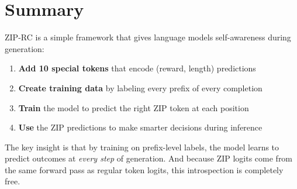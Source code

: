 \documentclass[11pt,a4paper]{article}
\begin{document}
\section{Summary}

ZIP-RC is a simple framework that gives language models self-awareness during generation:

\begin{enumerate}
    \item \textbf{Add 10 special tokens} that encode (reward, length) predictions
    \item \textbf{Create training data} by labeling every prefix of every completion
    \item \textbf{Train} the model to predict the right ZIP token at each position
    \item \textbf{Use} the ZIP predictions to make smarter decisions during inference
\end{enumerate}

The key insight is that by training on prefix-level labels, the model learns to predict outcomes at \textit{every step} of generation. And because ZIP logits come from the same forward pass as regular token logits, this introspection is completely free.
\end{document}

